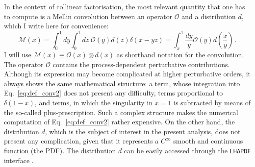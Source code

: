 In the context of collinear factorisation, the most relevant quantity that one has to compute is a Mellin convolution between an operator $\mathcal{O}$ and a distribution $d$, which I write here for convenience:
\begin{equation}
  \mathcal{M}(x) = \int_{0}^{1} dy \int_{0}^{1} dz \; \mathcal{O}(y) d(z) \delta(x-yz) = \int_{x}^{1} \frac{dy}{y} \mathcal{O}(y) d \left( \frac{x}{y} \right)\,.
  \label{eq:def_conv2}
\end{equation}
I will use $\mathcal{M}(x) \equiv \mathcal{O}(x) \otimes d(x)$ as shorthand notation for the convolution. The operator $\mathcal{O}$ contains the process-dependent perturbative contributions. Although its expression may become complicated at higher perturbative orders, it always shows the same mathematical structure: a  term, whose integration into Eq.~\eqref{eq:def_conv2} does not present any difficulty,  terms proportional to $\delta(1-x)$, and  terms, in which the singularity in $x=1$ is subtracted by means of the so-called plus-prescription. Such a complex structure makes the numerical computation of Eq.~\eqref{eq:def_conv2} rather expensive. On the other hand, the distribution $d$, which is the subject of interest in the present analysis, does not present any complication, given that it represents a $C^{\infty}$ smooth and continuous function (the PDF). The distribution $d$ can be easily accessed through the \texttt{LHAPDF} interface \cite{Buckley:2014ana}.%

